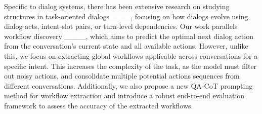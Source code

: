Specific to dialog systems, there has been extensive research on studying structures in task-oriented dialogs____, focusing on how dialogs evolve using dialog acts, intent-slot pairs, or turn-level dependencies. Our work parallels workflow discovery ____, which aims to predict the optimal next dialog action from the conversation's current state and all available actions. However, unlike this, we focus on extracting global workflows applicable across conversations for a specific intent. This increases the complexity of the task, as the model must filter out noisy actions, and consolidate multiple potential actions sequences from different conversations. Additionally, we also propose a new QA-CoT prompting method for workflow extraction and introduce a robust  end-to-end evaluation framework to assess the accuracy of the extracted workflows.
 
%